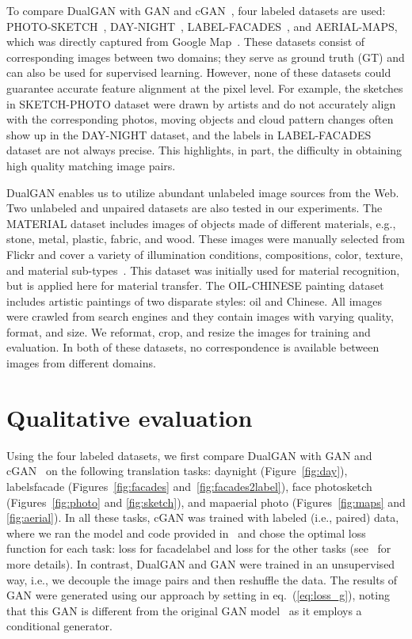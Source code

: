 To compare DualGAN with GAN and cGAN~\cite{isola2016image}, four labeled datasets are used: 
PHOTO-SKETCH~\cite{wang2009face,zhang2011coupled}, DAY-NIGHT~\cite{laffont2014transient}, 
LABEL-FACADES~\cite{tylevcek2013spatial}, and AERIAL-MAPS, which was directly captured from 
Google Map~\cite{isola2016image}. These datasets consist of corresponding images between two 
domains; they serve as ground truth (GT) and can also be used for supervised learning. However, none of these datasets could guarantee accurate feature alignment at the pixel level. For example, 
the sketches in SKETCH-PHOTO dataset were drawn by artists and do not accurately align with the 
corresponding photos, moving objects and cloud pattern changes often show up in the DAY-NIGHT dataset, 
and the labels in LABEL-FACADES dataset are not always precise. This highlights, in part, the difficulty in 
obtaining high quality matching image pairs.

DualGAN enables us to utilize abundant unlabeled image sources from the Web. Two unlabeled and 
unpaired datasets are also tested in our experiments. The MATERIAL dataset includes images of objects made of 
different materials, e.g., stone, metal, plastic, fabric, and wood. These images were manually selected from 
Flickr and cover a variety of illumination conditions, compositions, color, texture, and material 
sub-types~\cite{sharan2009material}. This dataset was initially used for material recognition, but is applied 
here for material transfer. The OIL-CHINESE painting dataset includes artistic paintings of two disparate styles: 
oil and Chinese. All images were crawled from search engines and they contain images with varying 
quality, format, and size. We reformat, crop, and resize the images for training and evaluation.
In both of these datasets, no correspondence is available between images from different domains.

\section{Qualitative evaluation}

Using the four labeled datasets, we first compare DualGAN with GAN and cGAN~\cite{isola2016image} on the 
following translation tasks: daynight (Figure~\ref{fig:day}), labelsfacade 
(Figures~\ref{fig:facades} and~\ref{fig:facades2label}), face photosketch (Figures~\ref{fig:photo} 
and \ref{fig:sketch}), and mapaerial photo (Figures~\ref{fig:maps} and \ref{fig:aerial}). 
In all these tasks, cGAN was trained with labeled (i.e., paired) data, where we ran the model and code provided 
in~\cite{isola2016image} and chose the optimal loss function for each task:  loss for facadelabel 
and  loss for the other tasks (see~\cite{isola2016image} for more details). In contrast, DualGAN and 
GAN were trained in an unsupervised way, i.e., we decouple the image pairs and then reshuffle the data. The 
results of GAN were generated using our approach by setting  in eq.~(\ref{eq:loss_g}), 
noting that this GAN is different from the original GAN model~\cite{goodfellow2014generative} as it employs a conditional 
generator.

